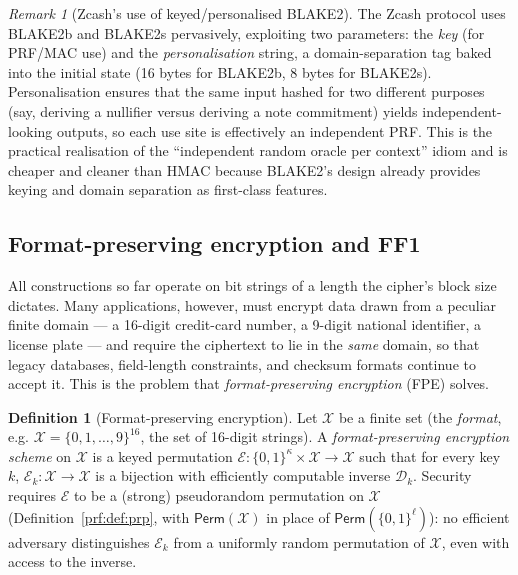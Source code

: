 \documentclass[11pt,a4paper]{article}
\theoremstyle{definition}
\newtheorem{definition}[theorem]{Definition}
\theoremstyle{remark}
\newtheorem{remark}[theorem]{Remark}
\begin{document}
\begin{remark}[Zcash's use of keyed/personalised BLAKE2]\label{prf:rem:blake2}
The Zcash protocol uses BLAKE2b and BLAKE2s pervasively, exploiting two parameters: the \emph{key} (for PRF/MAC use) and the \emph{personalisation} string, a domain-separation tag baked into the initial state (16 bytes for BLAKE2b, 8 bytes for BLAKE2s). Personalisation ensures that the same input hashed for two different purposes (say, deriving a nullifier versus deriving a note commitment) yields independent-looking outputs, so each use site is effectively an independent PRF. This is the practical realisation of the ``independent random oracle per context'' idiom and is cheaper and cleaner than HMAC because BLAKE2's design already provides keying and domain separation as first-class features.
\end{remark}

\subsection{Format-preserving encryption and FF1}\label{prf:ssec:fpe}

All constructions so far operate on bit strings of a length the cipher's block size dictates. Many applications, however, must encrypt data drawn from a peculiar finite domain --- a 16-digit credit-card number, a 9-digit national identifier, a license plate --- and require the ciphertext to lie in the \emph{same} domain, so that legacy databases, field-length constraints, and checksum formats continue to accept it. This is the problem that \emph{format-preserving encryption} (FPE) solves.

\begin{definition}[Format-preserving encryption]\label{prf:def:fpe}
Let \(\mathcal{X}\) be a finite set (the \emph{format}, e.g. \(\mathcal{X} = \{0,1,\dots,9\}^{16}\), the set of 16-digit strings). A \emph{format-preserving encryption scheme} on \(\mathcal{X}\) is a keyed permutation \(\mathcal{E} \colon \{0,1\}^{\kappa} \times \mathcal{X} \to \mathcal{X}\) such that for every key \(k\), \(\mathcal{E}_k \colon \mathcal{X} \to \mathcal{X}\) is a bijection with efficiently computable inverse \(\mathcal{D}_k\). Security requires \(\mathcal{E}\) to be a (strong) pseudorandom permutation on \(\mathcal{X}\) (Definition~\ref{prf:def:prp}, with \(\mathsf{Perm}(\mathcal{X})\) in place of \(\mathsf{Perm}(\{0,1\}^{\ell})\)): no efficient adversary distinguishes \(\mathcal{E}_k\) from a uniformly random permutation of \(\mathcal{X}\), even with access to the inverse.
\end{definition}
\end{document}
